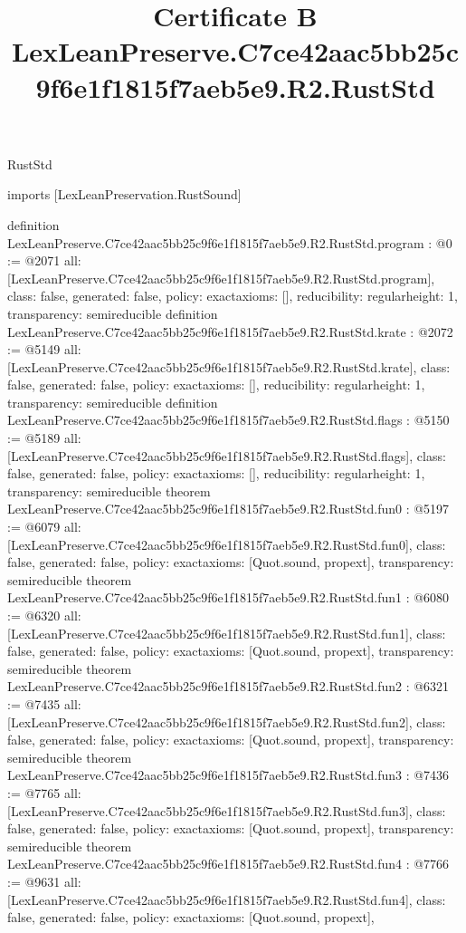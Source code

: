 \begin{lexlean}{RustStd}
\title{Certificate B LexLeanPreserve.C7ce42aac5bb25c9f6e1f1815f7aeb5e9.R2.RustStd}
\begin{coremodule}
imports [LexLeanPreservation.RustSound]

definition LexLeanPreserve.C7ce42aac5bb25c9f6e1f1815f7aeb5e9.R2.RustStd.program : @0 := @2071 {
  all: [LexLeanPreserve.C7ce42aac5bb25c9f6e1f1815f7aeb5e9.R2.RustStd.program],
  class: false,
  generated: false,
  policy: exact{axioms: []},
  reducibility: regular{height: 1},
  transparency: semireducible
}
definition LexLeanPreserve.C7ce42aac5bb25c9f6e1f1815f7aeb5e9.R2.RustStd.krate : @2072 := @5149 {
  all: [LexLeanPreserve.C7ce42aac5bb25c9f6e1f1815f7aeb5e9.R2.RustStd.krate],
  class: false,
  generated: false,
  policy: exact{axioms: []},
  reducibility: regular{height: 1},
  transparency: semireducible
}
definition LexLeanPreserve.C7ce42aac5bb25c9f6e1f1815f7aeb5e9.R2.RustStd.flags : @5150 := @5189 {
  all: [LexLeanPreserve.C7ce42aac5bb25c9f6e1f1815f7aeb5e9.R2.RustStd.flags],
  class: false,
  generated: false,
  policy: exact{axioms: []},
  reducibility: regular{height: 1},
  transparency: semireducible
}
theorem LexLeanPreserve.C7ce42aac5bb25c9f6e1f1815f7aeb5e9.R2.RustStd.fun0 : @5197 := @6079 {
  all: [LexLeanPreserve.C7ce42aac5bb25c9f6e1f1815f7aeb5e9.R2.RustStd.fun0],
  class: false,
  generated: false,
  policy: exact{axioms: [Quot.sound, propext]},
  transparency: semireducible
}
theorem LexLeanPreserve.C7ce42aac5bb25c9f6e1f1815f7aeb5e9.R2.RustStd.fun1 : @6080 := @6320 {
  all: [LexLeanPreserve.C7ce42aac5bb25c9f6e1f1815f7aeb5e9.R2.RustStd.fun1],
  class: false,
  generated: false,
  policy: exact{axioms: [Quot.sound, propext]},
  transparency: semireducible
}
theorem LexLeanPreserve.C7ce42aac5bb25c9f6e1f1815f7aeb5e9.R2.RustStd.fun2 : @6321 := @7435 {
  all: [LexLeanPreserve.C7ce42aac5bb25c9f6e1f1815f7aeb5e9.R2.RustStd.fun2],
  class: false,
  generated: false,
  policy: exact{axioms: [Quot.sound, propext]},
  transparency: semireducible
}
theorem LexLeanPreserve.C7ce42aac5bb25c9f6e1f1815f7aeb5e9.R2.RustStd.fun3 : @7436 := @7765 {
  all: [LexLeanPreserve.C7ce42aac5bb25c9f6e1f1815f7aeb5e9.R2.RustStd.fun3],
  class: false,
  generated: false,
  policy: exact{axioms: [Quot.sound, propext]},
  transparency: semireducible
}
theorem LexLeanPreserve.C7ce42aac5bb25c9f6e1f1815f7aeb5e9.R2.RustStd.fun4 : @7766 := @9631 {
  all: [LexLeanPreserve.C7ce42aac5bb25c9f6e1f1815f7aeb5e9.R2.RustStd.fun4],
  class: false,
  generated: false,
  policy: exact{axioms: [Quot.sound, propext]},
}
\end{coremodule}
\end{lexlean}
